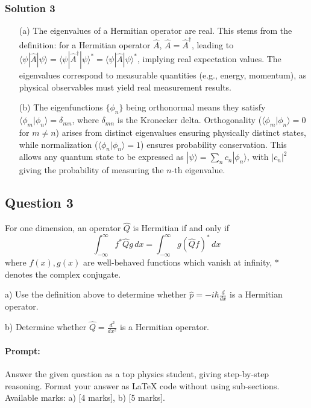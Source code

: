 \documentclass{article}
\begin{document}
\subsubsection{Solution 3}
\begin{enumerate}
    \item[(a)] The eigenvalues of a Hermitian operator are real. This stems from the definition: for a Hermitian operator $\hat{A}$, $\hat{A} = \hat{A}^\dagger$, leading to $\langle \psi | \hat{A} | \psi \rangle = \langle \psi | \hat{A}^\dagger | \psi \rangle^* = \langle \psi | \hat{A} | \psi \rangle^*$, implying real expectation values. The eigenvalues correspond to measurable quantities (e.g., energy, momentum), as physical observables must yield real measurement results.

    \item[(b)] The eigenfunctions $\{\phi_n\}$ being orthonormal means they satisfy $\langle \phi_m | \phi_n \rangle = \delta_{mn}$, where $\delta_{mn}$ is the Kronecker delta. Orthogonality ($\langle \phi_m | \phi_n \rangle = 0$ for $m \neq n$) arises from distinct eigenvalues ensuring physically distinct states, while normalization ($\langle \phi_n | \phi_n \rangle = 1$) ensures probability conservation. This allows any quantum state to be expressed as $|\psi\rangle = \sum_n c_n |\phi_n\rangle$, with $|c_n|^2$ giving the probability of measuring the $n$-th eigenvalue.
\end{enumerate}

\subsection{Question 3} 

For one dimension, an operator $\hat{Q}$ is Hermitian if and only if
\[
\int_{-\infty}^{\infty} f^* \hat{Q} g \, dx = \int_{-\infty}^{\infty} g (\hat{Q} f)^* \, dx
\]
where $f(x), g(x)$ are well-behaved functions which vanish at infinity, $*$ denotes the complex conjugate.

a) Use the definition above to determine whether $\hat{p} = -i\hbar \frac{d}{dx}$ is a Hermitian operator.

b) Determine whether $\hat{Q} = \frac{d^2}{dx^2}$ is a Hermitian operator.

\paragraph{Prompt: \\} 
Answer the given question as a top physics student, giving step-by-step reasoning. Format your answer as LaTeX code without using sub-sections. Available marks: a) [4 marks], b) [5 marks].
\end{document}
